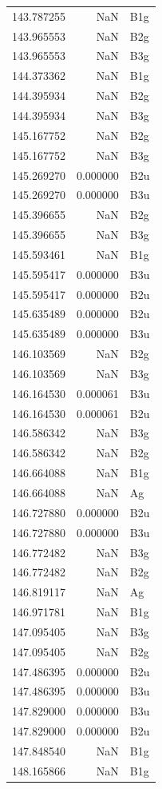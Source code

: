 \begin{longtable}{rrl}
143.787255 & NaN & B1g \\
143.965553 & NaN & B2g \\
143.965553 & NaN & B3g \\
144.373362 & NaN & B1g \\
144.395934 & NaN & B2g \\
144.395934 & NaN & B3g \\
145.167752 & NaN & B2g \\
145.167752 & NaN & B3g \\
145.269270 & 0.000000 & B2u \\
145.269270 & 0.000000 & B3u \\
145.396655 & NaN & B2g \\
145.396655 & NaN & B3g \\
145.593461 & NaN & B1g \\
145.595417 & 0.000000 & B3u \\
145.595417 & 0.000000 & B2u \\
145.635489 & 0.000000 & B2u \\
145.635489 & 0.000000 & B3u \\
146.103569 & NaN & B2g \\
146.103569 & NaN & B3g \\
146.164530 & 0.000061 & B3u \\
146.164530 & 0.000061 & B2u \\
146.586342 & NaN & B3g \\
146.586342 & NaN & B2g \\
146.664088 & NaN & B1g \\
146.664088 & NaN & Ag \\
146.727880 & 0.000000 & B2u \\
146.727880 & 0.000000 & B3u \\
146.772482 & NaN & B3g \\
146.772482 & NaN & B2g \\
146.819117 & NaN & Ag \\
146.971781 & NaN & B1g \\
147.095405 & NaN & B3g \\
147.095405 & NaN & B2g \\
147.486395 & 0.000000 & B2u \\
147.486395 & 0.000000 & B3u \\
147.829000 & 0.000000 & B3u \\
147.829000 & 0.000000 & B2u \\
147.848540 & NaN & B1g \\
148.165866 & NaN & B1g \\

\end{longtable}
